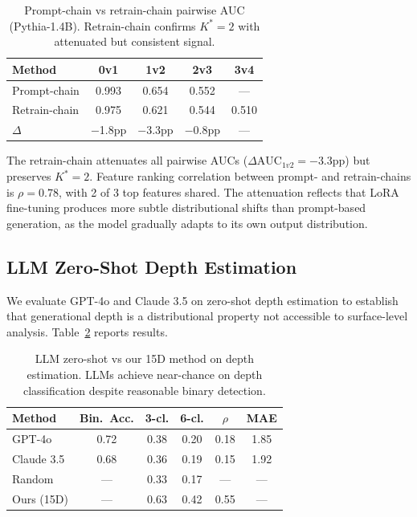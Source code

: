 \documentclass[11pt,a4paper]{article}
\newcommand{\Kstar}{K^{*}}
\newcommand{\AUC}{\mathrm{AUC}}
\begin{document}
\begin{table}[t]
\centering
\small
\caption{Prompt-chain vs retrain-chain pairwise AUC (Pythia-1.4B). Retrain-chain confirms $\Kstar=2$ with attenuated but consistent signal.}
\label{tab:retrain}
\begin{tabular}{lcccc}
\toprule
\textbf{Method} & \textbf{0v1} & \textbf{1v2} & \textbf{2v3} & \textbf{3v4} \\
\midrule
Prompt-chain & 0.993 & 0.654 & 0.552 & --- \\
Retrain-chain & 0.975 & 0.621 & 0.544 & 0.510 \\
$\Delta$ & $-$1.8pp & $-$3.3pp & $-$0.8pp & --- \\
\bottomrule
\end{tabular}
\end{table}

The retrain-chain attenuates all pairwise AUCs ($\Delta\AUC_{1v2} = -3.3$pp) but preserves $\Kstar=2$.
Feature ranking correlation between prompt- and retrain-chains is $\rho = 0.78$, with 2 of 3 top features shared.
The attenuation reflects that LoRA fine-tuning produces more subtle distributional shifts than prompt-based generation, as the model gradually adapts to its own output distribution.

\subsection{LLM Zero-Shot Depth Estimation}
\label{sec:llm-baseline}

We evaluate GPT-4o and Claude 3.5 on zero-shot depth estimation to establish that generational depth is a distributional property not accessible to surface-level analysis.
Table~\ref{tab:llm-zeroshot} reports results.

\begin{table}[t]
\centering
\small
\caption{LLM zero-shot vs our 15D method on depth estimation. LLMs achieve near-chance on depth classification despite reasonable binary detection.}
\label{tab:llm-zeroshot}
\begin{tabular}{lccccc}
\toprule
\textbf{Method} & \textbf{Bin.\ Acc.} & \textbf{3-cl.} & \textbf{6-cl.} & $\rho$ & \textbf{MAE} \\
\midrule
GPT-4o & 0.72 & 0.38 & 0.20 & 0.18 & 1.85 \\
Claude 3.5 & 0.68 & 0.36 & 0.19 & 0.15 & 1.92 \\
\midrule
Random & --- & 0.33 & 0.17 & --- & --- \\
Ours (15D) & --- & 0.63 & 0.42 & 0.55 & --- \\
\bottomrule
\end{tabular}
\end{table}
\end{document}
